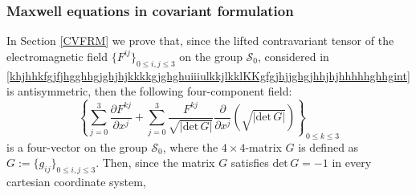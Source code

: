 \documentclass{article}
\theoremstyle{definition}
\theoremstyle{remark}
\newcommand{\er}{\eqref}
\newcommand{\er}{\eqref}
\begin{document}
\subsubsection{Maxwell equations in covariant formulation}
%
%
%
\begin{comment}
It is well known from Tensor Analysys that if $\{S^{ij}\}_{0\leq
i,j\leq 3}$ is the antisymmetric two times contravariant tensor and
if $\{\xi_{ij}\}_{0\leq i,j\leq 3}$ is a symmetric two times
covariant and non-degenerate tensor, both on the certain group
$\mathcal{S}$, then the four-component field $\{\theta_{k}\}_{0\leq
k\leq 3}$ defined by
\begin{equation}\label{MaxVacFullPPNhjjghjjkjhhoujiiint}
\theta_k:=\sum_{j=0}^{3}\frac{\partial S^{kj}}{\partial
x^j}+\sum_{j=0}^{3}\frac{S^{kj}}{\sqrt{|\text{det}\,\xi|}}\frac{\partial}{\partial
x^j}\left(\sqrt{|\text{det}\,\xi|}\right)\quad\quad\forall\,
k=0,1,2,3,
\end{equation}
is a four-vector on $\mathcal{S}$. Here $\xi$ is a $4\times
4$-matrix defined by:
\begin{equation}\label{fgjfjhgghhgjghjhjkkkkgjghghuiiiuujhjhjkljjhjhjjiint}
\xi=\{\xi_{ij}\}_{0\leq i,j\leq 3}.
\end{equation}
In particular,
\end{comment}
%
%
%
In Section \ref{CVFRM} we prove that, since the lifted contravariant
tensor of the electromagnetic field $\{F^{ij}\}_{0\leq i,j\leq 3}$
on the group $\mathcal{S}_0$, considered in
\er{khjhhkfgjfjhgghhgjghjhjkkkkgjghghuiiiulkkjlkklKKgfgjhjjghgjhhjhjhhhhhghhgint}
is antisymmetric, then
the following four-component field:
\begin{equation}\label{MaxVacFullPPNhjjghjjkjhhoujiiikjjihjhiuiuinthhint}
\left\{\sum_{j=0}^{3}\frac{\partial F^{kj}}{\partial
x^j}+\sum_{j=0}^{3}\frac{F^{kj}}{\sqrt{|\text{det}\,G|}}\frac{\partial}{\partial
x^j}\left(\sqrt{|\text{det}\,G|}\right)\right\}_{0\leq k\leq 3}
\end{equation}
is a four-vector on the group $\mathcal{S}_0$, where the $4\times
4$-matrix $G$ is defined as $G:=\{g_{ij}\}_{0\leq i,j\leq 3}$.
Then, since the matrix $G$ satisfies $\text{det}\,G=-1$ in every
cartesian coordinate system,
\end{document}
